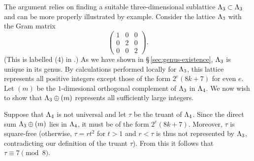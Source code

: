 The argument relies on finding a suitable three-dimensional sublattice
\(\Lambda_3 \subset \Lambda_3\) and can be more properly illustrated by
example. Consider the lattice \(\Lambda_3\) with the Gram matrix
\[
    \begin{pmatrix}
        1 & 0 & 0 \\
        0 & 2 & 0 \\
        0 & 0 & 2
    \end{pmatrix}.
\]
(This is labelled (4) in \cite[Table~1]{bhargava2000conway}.) As we have shown
in \S\,\ref{sec:genus-existence}, \(\Lambda_3\) is unique in its genus. By
calculations performed locally for \(\Lambda_3\), this lattice represents all
positive integers except those of the form \(2^e (8k + 7)\) for even \(e\). Let
\((m)\) be the \(1\)-dimesional orthogonal complement of \(\Lambda_3\) in
\(\Lambda_4\). We now wish to show that \(\Lambda_3 \oplus (m)\) represents
all sufficiently large integers.

Suppose that \(\Lambda_4\) is not universal and let \(\tau\) be the truant of
\(\Lambda_4\). Since the direct sum \(\Lambda_3 \oplus (m)\) lies in
\(\Lambda_4\), it must be of the form \(2^e(8k+7)\). Moreover, \(\tau\) is
square-free (otherwise, \(\tau = rt^2\) for \(t > 1\) and \(r < \tau\) is thus
not represented by \(\Lambda_3\), contradicting our definition of the truant
\(\tau\)). From this it follows that \(\tau \equiv 7 \pmod{8}\).

